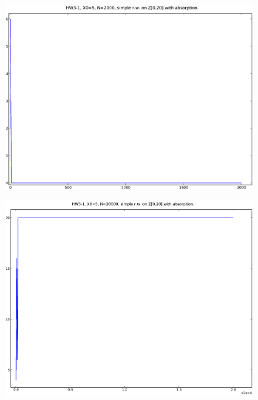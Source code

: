 \documentclass[a4paper,10pt]{article}
\begin{document}
\begin{figure}[p]
\includegraphics[width=1\textwidth]{hw3_1_a_N2000_X0_5.eps}
\caption{}
\end{figure}
\begin{figure}
\includegraphics[width=1\textwidth]{hw3_1_a_N20000_X0_5.eps}
\caption{}
\end{figure}
\end{document}
